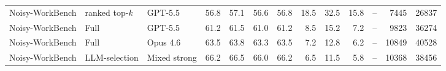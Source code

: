\begin{longtable}{lllrrrrrrrrrr}
Noisy-WorkBench & ranked top-$k$ & GPT-5.5 & 56.8 & 57.1 & 56.6 & 56.8 & 18.5 & 32.5 & 15.8 & -- & 7445 & 26837 \\
\rowcolor{tracesoft}
Noisy-WorkBench & \method{} Full & GPT-5.5 & 61.2 & 61.5 & 61.0 & 61.2 & 8.5 & 15.2 & 7.2 & -- & 9823 & 36274 \\
\rowcolor{tracesoft}
Noisy-WorkBench & \method{} Full & Opus 4.6 & 63.5 & 63.8 & 63.3 & 63.5 & 7.2 & 12.8 & 6.2 & -- & 10849 & 40528 \\
\rowcolor{tracesoft}
Noisy-WorkBench & \method{} LLM-selection & Mixed strong & 66.2 & 66.5 & 66.0 & 66.2 & 6.5 & 11.5 & 5.8 & -- & 10368 & 38456 \\
\end{longtable}
\endgroup
